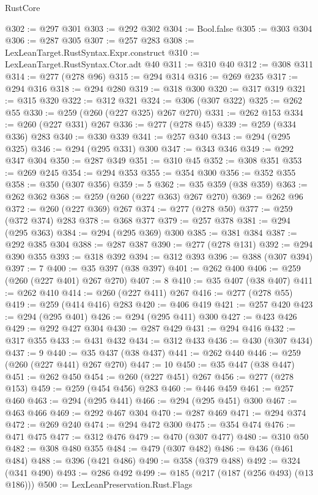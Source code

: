 \begin{lexlean}{RustCore}
\begin{coremodule}
@302 := @297 @301
@303 := @292 @302
@304 := Bool.false
@305 := @303 @304
@306 := @287 @305
@307 := @257 @283
@308 := LexLeanTarget.RustSyntax.Expr.construct
@310 := LexLeanTarget.RustSyntax.Ctor.adt @40
@311 := @310 @40
@312 := @308 @311
@314 := @277 (@278 @96)
@315 := @294 @314
@316 := @269 @235
@317 := @294 @316
@318 := @294 @280
@319 := @318 @300
@320 := @317 @319
@321 := @315 @320
@322 := @312 @321
@324 := @306 (@307 @322)
@325 := @262 @55
@330 := @259 (@260 (@227 @325) @267 @270)
@331 := @262 @153
@334 := @260 (@227 @331) @267
@336 := @277 (@278 @45)
@339 := @259 (@334 @336) @283
@340 := @330 @339
@341 := @257 @340
@343 := @294 (@295 @325)
@346 := @294 (@295 @331) @300
@347 := @343 @346
@349 := @292 @347 @304
@350 := @287 @349
@351 := @310 @45
@352 := @308 @351
@353 := @269 @245
@354 := @294 @353
@355 := @354 @300
@356 := @352 @355
@358 := @350 (@307 @356)
@359 := 5
@362 := @35 @359 (@38 @359)
@363 := @262 @362
@368 := @259 (@260 (@227 @363) @267 @270)
@369 := @262 @96
@372 := @260 (@227 @369) @267
@374 := @277 (@278 @50)
@377 := @259 (@372 @374) @283
@378 := @368 @377
@379 := @257 @378
@381 := @294 (@295 @363)
@384 := @294 (@295 @369) @300
@385 := @381 @384
@387 := @292 @385 @304
@388 := @287 @387
@390 := @277 (@278 @131)
@392 := @294 @390 @355
@393 := @318 @392
@394 := @312 @393
@396 := @388 (@307 @394)
@397 := 7
@400 := @35 @397 (@38 @397)
@401 := @262 @400
@406 := @259 (@260 (@227 @401) @267 @270)
@407 := 8
@410 := @35 @407 (@38 @407)
@411 := @262 @410
@414 := @260 (@227 @411) @267
@416 := @277 (@278 @55)
@419 := @259 (@414 @416) @283
@420 := @406 @419
@421 := @257 @420
@423 := @294 (@295 @401)
@426 := @294 (@295 @411) @300
@427 := @423 @426
@429 := @292 @427 @304
@430 := @287 @429
@431 := @294 @416
@432 := @317 @355
@433 := @431 @432
@434 := @312 @433
@436 := @430 (@307 @434)
@437 := 9
@440 := @35 @437 (@38 @437)
@441 := @262 @440
@446 := @259 (@260 (@227 @441) @267 @270)
@447 := 10
@450 := @35 @447 (@38 @447)
@451 := @262 @450
@454 := @260 (@227 @451) @267
@456 := @277 (@278 @153)
@459 := @259 (@454 @456) @283
@460 := @446 @459
@461 := @257 @460
@463 := @294 (@295 @441)
@466 := @294 (@295 @451) @300
@467 := @463 @466
@469 := @292 @467 @304
@470 := @287 @469
@471 := @294 @374
@472 := @269 @240
@474 := @294 @472 @300
@475 := @354 @474
@476 := @471 @475
@477 := @312 @476
@479 := @470 (@307 @477)
@480 := @310 @50
@482 := @308 @480 @355
@484 := @479 (@307 @482)
@486 := @436 (@461 @484)
@488 := @396 (@421 @486)
@490 := @358 (@379 @488)
@492 := @324 (@341 @490)
@493 := @286 @492
@499 := @185 (@217 (@187 (@256 @493) (@13 @186)))
@500 := LexLeanPreservation.Rust.Flags

\end{coremodule}
\end{lexlean}
